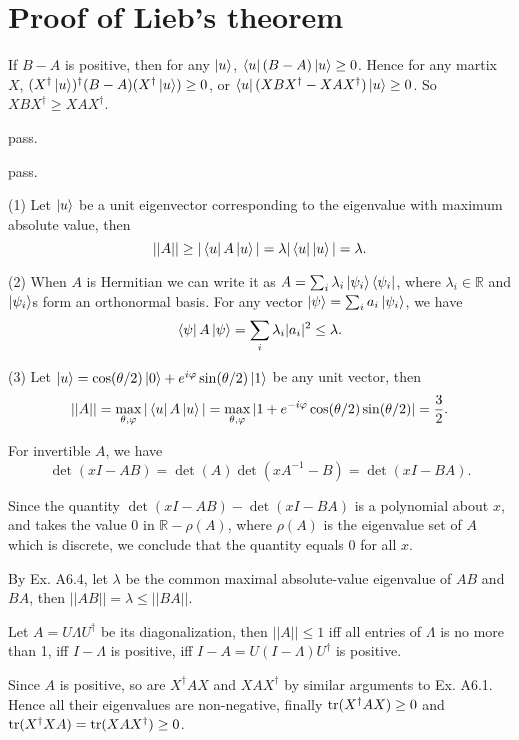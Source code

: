 \chapter{Proof of Lieb's theorem}

\ex If $B-A$ is positive, then for any $\left|u\right\rangle$, $\left\langle u\right|(B-A)\left|u\right\rangle \ge 0$.
Hence for any martix $X$, $(X^\dagger\left|u\right\rangle)^\dagger(B-A)(X^\dagger\left|u\right\rangle) \ge 0$, or $\left\langle u\right|(XBX^\dagger-XAX^\dagger)\left|u\right\rangle \ge 0$.
So $XBX^\dagger \ge XAX^\dagger$.

\ex pass.

\ex pass.

\ex (1) Let $\left|u\right\rangle$ be a unit eigenvector corresponding to the eigenvalue with maximum absolute value, then
$$
||A|| \ge |\left\langle u\right|A\left|u\right\rangle| = \lambda|\left\langle u\right|\left|u\right\rangle| = \lambda.
$$

(2) When $A$ is Hermitian we can write it as $A=\sum_i\lambda_i\left|\psi_i\right\rangle\left\langle\psi_i\right|$, where $\lambda_i\in\mathbb{R}$ and $\left|\psi_i\right\rangle$s form an orthonormal basis.
For any vector $\left|\psi\right\rangle=\sum_ia_i\left|\psi_i\right\rangle$, we have
$$
\left\langle\psi\right|A\left|\psi\right\rangle = \sum_i\lambda_i|a_i|^2 \le \lambda.
$$

(3) Let $\left|u\right\rangle = \cos(\theta/2)\left|0\right\rangle + e^{i\varphi}\sin(\theta/2)\left|1\right\rangle$ be any unit vector, then
$$
||A|| = \max_{\theta,\varphi}|\left\langle u\right|A\left|u\right\rangle| = \max_{\theta,\varphi}|1 + e^{-i\varphi}\cos(\theta/2)\sin(\theta/2)| = \frac{3}{2}.
$$

\ex For invertible $A$, we have
$$
\det(xI-AB) = \det(A)\det(xA^{-1}-B) = \det(xI-BA).
$$

Since the quantity $\det(xI-AB) - \det(xI-BA)$ is a polynomial about $x$, and takes the value 0 in $\mathbb{R}-\rho(A)$, where $\rho(A)$ is the eigenvalue set of $A$ which is discrete, we conclude that the quantity equals 0 for all $x$.

\ex By Ex. A6.4, let $\lambda$ be the common maximal absolute-value eigenvalue of $AB$ and $BA$, then $||AB||=\lambda\le||BA||$.

\ex Let $A=U\Lambda U^\dagger$ be its diagonalization, then $||A|| \le 1$ iff all entries of $\Lambda$ is no more than 1, iff $I-\Lambda$ is positive, iff $I-A=U(I-\Lambda)U^\dagger$ is positive.

\ex Since $A$ is positive, so are $X^\dagger AX$ and $XAX^\dagger$ by similar arguments to Ex. A6.1.
Hence all their eigenvalues are non-negative, finally $\operatorname{tr}(X^\dagger AX) \ge 0$ and $\operatorname{tr}(X^\dagger XA) = \operatorname{tr}(XAX^\dagger) \ge 0$.